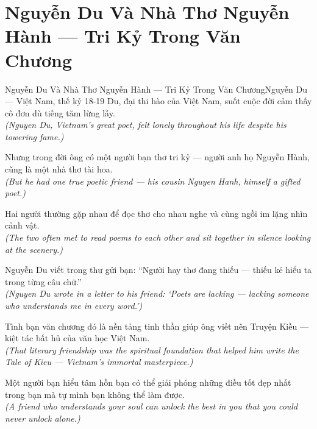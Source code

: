 \section{Nguyễn Du Và Nhà Thơ Nguyễn Hành --- Tri Kỷ Trong Văn Chương}
\begin{truyen}{Nguyễn Du Và Nhà Thơ Nguyễn Hành --- Tri Kỷ Trong Văn Chương}{Nguyễn Du --- Việt Nam, thế kỷ 18-19}
 Du, đại thi hào của Việt Nam, suốt cuộc đời cảm thấy cô đơn dù tiếng tăm lừng lẫy.\\[4pt]
\textit{(Nguyen Du, Vietnam's great poet, felt lonely throughout his life despite his towering fame.)}

Nhưng trong đời ông có một người bạn thơ tri kỷ --- người anh họ Nguyễn Hành, cũng là một nhà thơ tài hoa.\\[4pt]
\textit{(But he had one true poetic friend --- his cousin Nguyen Hanh, himself a gifted poet.)}

Hai người thường gặp nhau để đọc thơ cho nhau nghe và cùng ngồi im lặng nhìn cảnh vật.\\[4pt]
\textit{(The two often met to read poems to each other and sit together in silence looking at the scenery.)}

Nguyễn Du viết trong thư gửi bạn: ``Người hay thơ đang thiếu --- thiếu kẻ hiểu ta trong từng câu chữ.''\\[4pt]
\textit{(Nguyen Du wrote in a letter to his friend: `Poets are lacking --- lacking someone who understands me in every word.')}

Tình bạn văn chương đó là nền tảng tinh thần giúp ông viết nên Truyện Kiều --- kiệt tác bất hủ của văn học Việt Nam.\\[4pt]
\textit{(That literary friendship was the spiritual foundation that helped him write the Tale of Kieu --- Vietnam's immortal masterpiece.)}

\end{truyen}
\begin{baihoc}
  Một người bạn hiểu tâm hồn bạn có thể giải phóng những điều tốt đẹp nhất trong bạn mà tự mình bạn không thể làm được.\\[4pt]
  \textit{(A friend who understands your soul can unlock the best in you that you could never unlock alone.)}
\end{baihoc}

